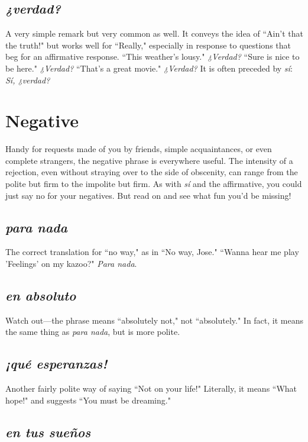 \subsection{\emph{¿verdad?}}

A very simple remark but very common as well. It conveys the
idea of ``Ain't that the truth!" but works well for ``Really," especially
in response to questions that beg for an affirmative response. ``This
weather's lousy." \emph{¿Verdad?} ``Sure is nice to be here." \emph{¿Verdad?} ``That's
a great movie." \emph{¿Verdad?} It is often preceded by \emph{sí}: \emph{Sí, ¿verdad?}

\section{Negative}

Handy for requests made of you by friends, simple acquaintances, or even complete strangers, the negative phrase is everywhere
useful. The intensity of a rejection, even without straying over to the
side of obscenity, can range from the polite but firm to the impolite
but firm. As with \emph{sí} and the affirmative, you could just say no for your
negatives. But read on and see what fun you'd be missing!

\subsection{\emph{para nada}}

The correct translation for ``no way," as in ``No way, Jose."
``Wanna hear me play 'Feelings' on my kazoo?" \emph{Para nada}.

\subsection{\emph{en absoluto}}

Watch out---the phrase means ``absolutely not," not ``absolutely." In fact, it means the same thing as \emph{para nada}, but is
more polite.

\subsection{\emph{¡qué esperanzas!}}

Another fairly polite way of saying ``Not on your life!" Literally, it means ``What hope!" and suggests ``You must be dreaming."

\subsection{\emph{en tus sueños}}

